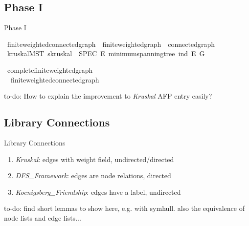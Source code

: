 \documentclass[%
	sans,
	12pt,
]{beamer}
\def\isacartoucheopen{}%
\def\isacartoucheclose{}%
\begin{document}
\subsection{Phase I}%
\begin{frame}{Phase I}

\begin{isabelle}
	\isamarkupfalse%
	\ finite{\isacharunderscore}weighted{\isacharunderscore}connected{\isacharunderscore}graph\ {\isacharequal}\ finite{\isacharunderscore}weighted{\isacharunderscore}graph\ {\isacharplus}\ connected{\isacharunderscore}graph\isanewline
	\isanewline
	\isanewline
	\ \ \isamarkupfalse%
	\ kruskal{}{\isacharunderscore}MST{\isacharcolon}\ {\isacartoucheopen}s{\isachardot}kruskal{}\ {\isasymle}\ SPEC\ {\isacharparenleft}{\isasymlambda}E{\isacharprime}{\isachardot}\ minimum{\isacharunderscore}spanning{\isacharunderscore}tree\ {\isacharparenleft}ind\ E{\isacharprime}{\isacharparenright}\ G{\isacharparenright}{\isacartoucheclose}
	\isanewline
	\isanewline
	\isamarkupfalse%
\end{isabelle}\pause%

\begin{isabelle}
	\isamarkupfalse%
	\ complete{\isacharunderscore}finite{\isacharunderscore}weighted{\isacharunderscore}graph\ {\isasymsubseteq}\\ \ \ finite{\isacharunderscore}weighted{\isacharunderscore}connected{\isacharunderscore}graph
	\end{isabelle}
to-do: How to explain the improvement to \textit{Kruskal} AFP entry easily?
\end{frame}

\subsection{Library Connections}
\begin{frame}{Library Connections}
\begin{enumerate}
	\item \textit{Kruskal}: edges with weight field, undirected/directed
	\item \textit{DFS\_Framework}: edges are node relations, directed
	\item \textit{Koenigsberg\_Friendship}: edges have a label, undirected
\end{enumerate}
to-do: find short lemmas to show here, e.g. with symhull. also the equivalence of node lists and edge lists...
\end{frame}
\end{document}
